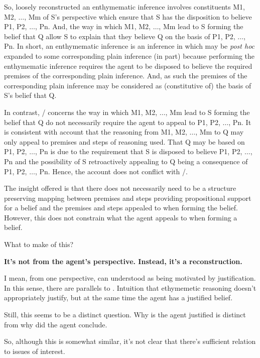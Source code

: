 \begin{note}
  So, loosely reconstructed an enthymematic inference involves constituents M1, M2, \(\dots\), Mm of S's perspective which ensure that S has the disposition to believe P1, P2, \(\dots\), Pn.
  And, the way in which M1, M2, \(\dots\), Mm lead to S forming the belief that Q allow S to explain that they believe Q on the basis of P1, P2, \(\dots\), Pn.
  In short, an enthymematic inference is an inference in which may be \emph{post hoc} expanded to some corresponding plain inference (in part) because performing the enthymematic inference requires the agent to be disposed to believe the required premises of the corresponding plain inference.
  And, as such the premises of the corresponding plain inference may be considered as (constitutive of) the basis of S's belief that Q.

  In contrast, \issueConstraint{}/\issueInclusion{} concerns the way in which M1, M2, \(\dots\), Mm lead to S forming the belief that Q do not necessarily require the agent to appeal to P1, P2, \(\dots\), Pn.
  It is consistent with \citeauthor{Moretti:2019wx} account that the reasoning from M1, M2, \(\dots\), Mm to Q may only appeal to premises and steps of reasoning used.
  That Q may be based on P1, P2, \(\dots\), Pn is due to the requirement that S is disposed to believe P1, P2, \(\dots\), Pn and the possibility of S retroactively appealing to Q being a consequence of P1, P2, \(\dots\), Pn.
  Hence, the account does not conflict with \issueConstraint{}/\issueInclusion{}.

  The insight offered is that there does not necessarily need to be a structure preserving mapping between premises and steps providing propositional support for a belief and the premises and steps appealed to when forming the belief.
  However, this does not constrain what the agent appeals to when forming a belief.
\end{note}

\begin{note}
  {
    \color{red}
    What to make of this?

    \textbf{
      It's not from the agent's perspective.
      Instead, it's a reconstruction.
    }

    I mean, from one perspective, \citeauthor{Moretti:2019wx} can understood as being motivated by justification.
    In this sense, there are parallels to \citeauthor{Lehrer:1971aa}.
    Intuition that ethymemetic reasoning doesn't appropriately justify, but at the same time the agent has a justified belief.

    Still, this seems to be a distinct question.
    Why is the agent justified is distinct from why did the agent conclude.

    So, although this is somewhat similar, it's not clear that there's sufficient relation to issues of interest.
  }
\end{note}



